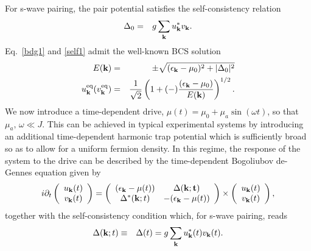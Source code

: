 \documentclass[a4paper,10pt]{report}
\begin{document}
For s-wave pairing, the pair potential satisfies the
self-consistency relation
\begin{eqnarray}
\Delta_0 &=& g \sum_{\bf k} u_{\bf k}^{\ast} v_{\bf k}.
\label{self1}
\end{eqnarray}
Eq.\ \ref{bdg1} and \ref{self1} admit the well-known BCS solution
\begin{eqnarray}
E({\bf k})&=& \pm \sqrt{(\epsilon_{{\bf k}}-\mu_0)^2+|\Delta_0|^2}
\nonumber\\
u^{\rm eq}_{\bf k} (v^{\rm eq}_{\bf k}) &=& \frac{1}{{\sqrt 2}}
\left( 1+(-) \frac{(\epsilon_{\bf k} -\mu_0)}{E({\bf k})}
\right)^{1/2}. \label{eqsol}
\end{eqnarray}
We now introduce a time-dependent drive, $\mu(t)=\mu_0 +\mu_a
\sin(\omega t)$, so that $\mu_a, \,  \omega \ll J $. This can be
achieved in typical experimental systems by introducing an
additional time-dependent harmonic trap potential which is
sufficiently broad so as to allow for a uniform fermion density. In
this regime, the response of the system to the drive can be
described by the time-dependent Bogoliubov de-Gennes equation given
by
\begin{equation}
i \partial_t \left(\begin{array}{c} u_{\bf k}(t) \\ v_{\bf k}(t)
\end{array} \right) = \left(
\begin{array}{cc}
(\epsilon_{\bf k}-\mu (t)) & \Delta({\bf k;t})\\
\Delta^{\ast}({\bf k};t) & -(\epsilon_{\bf k}-\mu (t))
\end{array} \right) 
\times \left(\begin{array}{c} u_{\bf k}(t)\\ v_{\bf k}(t)
\end{array} \right), \label{bdg2}
\end{equation}
together with the self-consistency condition which, for s-wave
pairing, reads
\begin{eqnarray}
\Delta({\bf k};t) &\equiv& \Delta(t) = g \sum_{\bf k} u^{\ast}_{\bf
k}(t) v_{\bf k}(t).\label{tdsc1}
\end{eqnarray}
\end{document}
